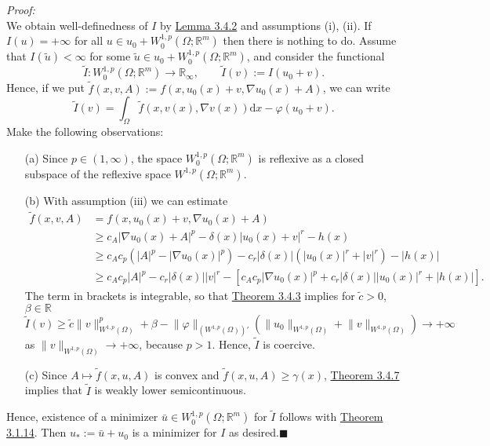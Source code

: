 \textit{Proof:}\\
We obtain well-definedness of $I$ by \hyperlink{lemma_3_4_2}{Lemma 3.4.2} and assumptions (i), (ii). If $I(u)=+\infty$ for all $u\in u_0+W_0^{1,p}(\Omega;\mathbb{R}^m)$ then there is nothing to do. Assume that $I(\tilde{u})<\infty$ for some $\tilde{u}\in u_0+W_0^{1,p}(\Omega;\mathbb{R}^m)$, and consider the functional
\[\tilde{I}:W_0^{1,p}(\Omega;\mathbb{R}^m)\longrightarrow\mathbb{R}_\infty,\qquad\tilde{I}(v):=I(u_0+v).\]
Hence, if we put $\tilde{f}(x,v,A):=f(x,u_0(x)+v,\nabla u_0(x)+A)$, we can write
\[\tilde{I}(v)=\int_\Omega{\tilde{f}(x,v(x),\nabla v(x))\mathrm{d}x}-\varphi(u_0+v).\]
Make the following observations:
\begin{itemize}
	\item[(a)] Since $p\in(1,\infty)$, the space $W_0^{1,p}(\Omega;\mathbb{R}^m)$ is reflexive as a closed subspace of the reflexive space $W^{1,p}(\Omega;\mathbb{R}^m)$.
	\item[(b)] With assumption (iii) we can estimate
	\begin{align*}
		\tilde{f}(x,v,A)&=f(x,u_0(x)+v,\nabla u_0(x)+A)\\
		&\geq c_A\lvert\nabla u_0(x)+A\rvert^p-\delta(x)\lvert u_0(x)+v\rvert^r-h(x)\\
		&\geq c_Ac_p\left(\lvert A\rvert^p-\lvert\nabla u_0(x)\rvert^p\right)-c_r\lvert\delta(x)\rvert\left(\lvert u_0(x)\rvert^r+\lvert v\rvert^r\right)-\lvert h(x)\rvert\\
		&\geq c_Ac_p\lvert A\vert^p-c_r\lvert\delta(x)\rvert\lvert v\rvert^r-\left[c_Ac_p\lvert\nabla u_0(x)\rvert^p+c_r\lvert\delta(x)\rvert\lvert u_0(x)\rvert^r+\lvert h(x)\vert\right].
	\end{align*}
	The term in brackets is integrable, so that \hyperlink{theorem_3_4_3}{Theorem 3.4.3} implies for $\tilde{c}>0$, $\beta\in\mathbb{R}$
	\[\tilde{I}(v)\geq\tilde{c}\lVert v\rVert_{W^{1,p}(\Omega)}^p+\beta-\lVert\varphi\rVert_{(W^{1,p}(\Omega))'}\left(\lVert u_0\rVert_{W^{1,p}(\Omega)}+\lVert v\rVert_{W^{1,p}(\Omega)}\right)\to+\infty\]
	as $\lVert v\rVert_{W^{1,p}(\Omega)}\to+\infty$, because $p>1$. Hence, $\tilde{I}$ is coercive.
	\item[(c)] Since $A\longmapsto\tilde{f}(x,u,A)$ is convex and $\tilde{f}(x,u,A)\geq\gamma(x)$, \hyperlink{theorem_3_4_7}{Theorem 3.4.7} implies that $\tilde{I}$ is weakly lower semicontinuous.
\end{itemize}
Hence, existence of a minimizer $\bar{u}\in W_0^{1,p}(\Omega;\mathbb{R}^m)$ for $\tilde{I}$ follows with \hyperlink{theorem_3_1_14}{Theorem 3.1.14}. Then $u_*:=\bar{u}+u_0$ is a minimizer for $I$ as desired.\hfill$\blacksquare$\\[11pt]

